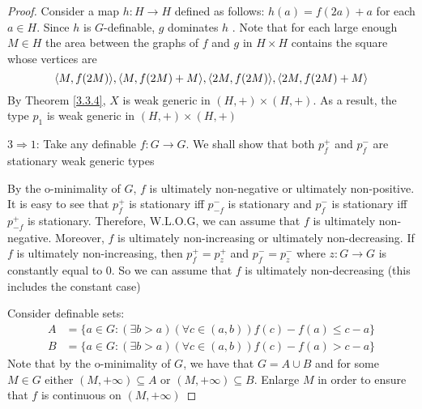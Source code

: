 \documentclass[11pt]{article}
\begin{document}
\begin{proof}
Consider a map \(h:H\to H\) defined as follows: \(h(a)=f(2a)+a\) for each \(a\in H\). Since \(h\)
is \(G\)-definable, \(g\) dominates \(h\) \label{Problem5}.
Note that for each large enough \(M\in H\) the area
between the graphs of \(f\) and \(g\) in \(H\times H\) contains the square whose vertices are
\begin{equation*}
\langle M,f(2M)\rangle,\langle M,f(2M)+M\rangle, \langle 2M,f(2M)\rangle, \langle 2M,f(2M)+M\rangle
\end{equation*}
By Theorem \ref{3.3.4}, \(X\) is weak generic in \((H,+)\times(H,+)\). As a result, the type \(p_1\) is
weak generic in \((H,+)\times(H,+)\)

\(3\Rightarrow 1\): Take any definable \(f:G\to G\). We shall show that both \(p_f^+\) and \(p_f^-\) are
stationary weak generic types

By the o-minimality of \(G\), \(f\) is ultimately non-negative or ultimately non-positive. It is
easy to see that \(p_f^+\) is stationary iff \(p_{-f}^-\) is stationary and \(p_f^-\) is stationary
iff \(p_{-f}^+\) is stationary. Therefore, W.L.O.G, we can assume that \(f\) is ultimately
non-negative. Moreover, \(f\) is ultimately non-increasing or ultimately non-decreasing.
If \(f\) is ultimately non-increasing, then \(p_f^+=p_z^+\) and \(p_f^-=p_z^-\) where \(z:G\to G\) is
constantly equal to 0.
So we can assume that \(f\) is ultimately non-decreasing (this includes the constant case)

Consider definable sets:
\begin{align*}
A&=\{a\in G:(\exists b>a)(\forall c\in(a,b))f(c)-f(a)\le c-a\}\\
B&=\{a\in G:(\exists b>a)(\forall c\in(a,b))f(c)-f(a)>c-a\}
\end{align*}
Note that by the o-minimality of \(G\), we have that \(G=A\cup B\) and for some \(M\in G\)
either \((M,+\infty)\subseteq A\) or \((M,+\infty)\subseteq B\). Enlarge \(M\) in order to ensure that \(f\) is continuous
on \((M,+\infty)\)


\end{proof}
\end{document}

